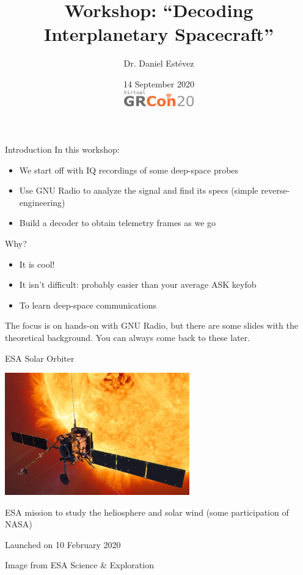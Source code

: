 \documentclass[aspectratio=169]{beamer}
\title{Workshop: ``Decoding Interplanetary Spacecraft''}
\author{Dr. Daniel Est\'evez}
\institute
{}
\date %
[GRCon20, September 2020]{14 September 2020\\\vspace{1em}\includegraphics[width=3cm]{grcon20}}
\begin{document}
\begin{frame}
  \titlepage
\end{frame}

\begin{frame}{Introduction}
  In this workshop:

  \begin{itemize}
  \item We start off with IQ recordings of some deep-space probes
  \item Use GNU Radio to analyze the signal and find its specs (simple
    reverse-engineering)
  \item Build a decoder to obtain telemetry frames as we go
  \end{itemize}

  Why?
  \begin{itemize}
  \item It is cool!
  \item It isn't difficult: probably easier than your average ASK keyfob
  \item To learn deep-space communications
  \end{itemize}

  The focus is on hands-on with GNU Radio, but there are some slides with the
  theoretical background. You can always come back to these later.
\end{frame}

\begin{frame}{ESA Solar Orbiter}
  \begin{center}
    \includegraphics[width=8cm]{solar_orbiterTHUMB}
  \end{center}

  ESA mission to study the heliosphere and solar wind (some participation of NASA)
  
  Launched on 10 February 2020

  \begin{flushright}
    {\tiny * Image from ESA Science \& Exploration}
  \end{flushright}
\end{frame}
\end{document}
